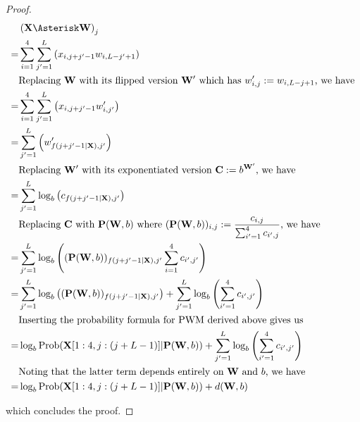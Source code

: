 \documentclass[12pt]{article}
\newcommand{\matrixSymbol}[1]{\mathbf{#1}}
\begin{document}
\begin{proof}
\begin{align}
  & \left( \matrixSymbol{X} \Asterisk \matrixSymbol{W} \right)_j  \notag \\
= & \sum_{i=1}^{4}{\sum_{j'=1}^{L}{ \left( x_{i, j+j'-1}w_{i, L-j'+1} \right) } } \\
  & \text{Replacing $\matrixSymbol{W}$ with its flipped version $\matrixSymbol{W'}$ which has $w'_{i, j} := w_{i, L-j+1}$, we have} \notag \\
= & \sum_{i=1}^{4}{\sum_{j'=1}^{L}{ \left( x_{i, j+j'-1}w'_{i, j'} \right) }  } \\
= & \sum_{j'=1}^{L}{\left( w'_{f(j + j' - 1|\matrixSymbol{X}), j'} \right) } \notag \\
  & \text{Replacing $\matrixSymbol{W'}$ with its exponentiated version $\matrixSymbol{C} := b^{\matrixSymbol{W'}}$, we have} \notag \\
= & \sum_{j'=1}^{L}{ \log_{b}\left( c_{f(j + j' - 1|\matrixSymbol{X}), j'} \right) } \\
  & \text{Replacing $\matrixSymbol{C}$ with $\matrixSymbol{P}(\matrixSymbol{W}, b)$ where $ (\matrixSymbol{P}(\matrixSymbol{W}, b))_{i, j}  := \frac{c_{i, j}}{\sum_{i'=1}^{4}{c_{i', j}}} $,  we have} \notag \\
= & \sum_{j'=1}^{L}{ \log_{b}\left( (\matrixSymbol{P}(\matrixSymbol{W}, b))_{f(j + j' - 1|\matrixSymbol{X}), j'} \sum_{i=1}^{4}{c_{i', j'}} \right) } \\
= & \sum_{j'=1}^{L}{ \log_{b}\left( (\matrixSymbol{P}(\matrixSymbol{W}, b))_{f(j + j' - 1|\matrixSymbol{X}), j'} \right) } + \sum_{j'=1}^{L}{\log_{b} \left( \sum_{i'=1}^{4}{c_{i', j'}} \right) } \notag \\
  & \text{Inserting the probability formula for PWM derived above gives us} \notag  \\ 
= & \log_{b}{\mathrm{Prob}(\matrixSymbol{X}[1:4, j:(j+L-1)]|\matrixSymbol{P}(\matrixSymbol{W}, b))} + \sum_{j'=1}^{L}{\log_{b} \left( \sum_{i'=1}^{4}{c_{i', j'}} \right) }  \\
  & \text{Noting that the latter term depends entirely on $\matrixSymbol{W}$ and $b$, we have} \notag \\
= & \log_{b}{\mathrm{Prob}(\matrixSymbol{X}[1:4, j:(j+L-1)]|\matrixSymbol{P}(\matrixSymbol{W}, b))} + d(\matrixSymbol{W}, b) 
\end{align}

which concludes the proof.
\end{proof}
\end{document}
